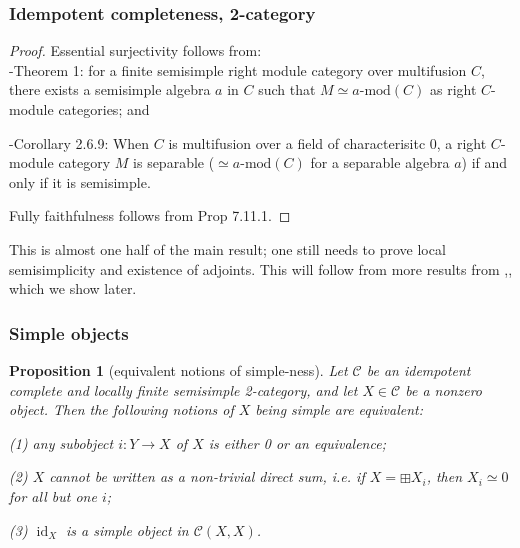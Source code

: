 \documentclass{beamer}
\DeclareMathOperator{\id}{id}
\newtheorem{proposition}[theorem]{Proposition}
\newcommand{\cC}{{\mathcal{C}}}
\newcommand{\amod}[1]{{#1\textrm{-mod}}}
\begin{document}
\begin{frame}
\frametitle{Idempotent completeness, 2-category}

\begin{proof}
Essential surjectivity follows from:\\
-\cite{Ostrik}{Theorem 1}: for a finite semisimple right module
category over multifusion $C$, there exists a semisimple algebra
$a$ in $C$ such that $M \simeq \amod{a}(C)$
as right $C$-module categories; and

\pause
-\cite{DSPSb}{Corollary 2.6.9}: When $C$ is multifusion over
a field of characterisitc 0,
a right $C$-module category $M$ is separable
($\simeq \amod{a}(C)$ for a separable algebra $a$)
if and only if it is semisimple.

\pause

Fully faithfulness follows from \cite{EGNO}{Prop 7.11.1}.
\end{proof}

\pause

This is almost one half of the main result;
one still needs to prove local semisimplicity
and existence of adjoints.
This will follow from more results from \cite{DSPSa},\cite{DSPSb},
which we show later.

\end{frame}
\begin{frame}
\frametitle{Simple objects}

\pause

\begin{proposition}[equivalent notions of simple-ness]
Let $\cC$ be an idempotent complete and
locally finite semisimple 2-category,
and let $X \in \cC$ be a nonzero object.
Then the following notions of $X$ being simple are equivalent:

\pause

(1) any subobject $i: Y \to X$ of $X$
 is either 0 or an equivalence;

\pause

(2) $X$ cannot be written as a non-trivial direct sum,
	i.e. if $X = \boxplus X_i$,
	then $X_i \simeq 0$ for all but one $i$;

\pause

(3) $\id_X$ is a simple object in $\cC(X,X)$.
\end{proposition}

\end{frame}
\end{document}

